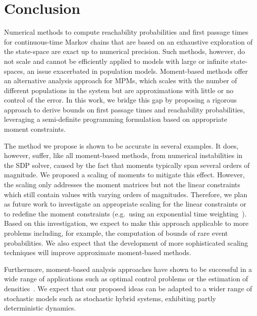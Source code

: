 \section{Conclusion}\label{sec:mfpt:conclusion}
Numerical methods to compute reachability probabilities and first passage times
for continuous-time Markov chains that are based on an exhaustive
exploration of the state-space
are exact up to numerical precision. Such methods, however, do not
scale and cannot be efficiently applied to models with large or
infinite state-spaces,
an issue exacerbated in population models. Moment-based methods offer
an alternative analysis approach
for \acp{MPM}, which scales with the number of different populations
in the system
but are approximations with little or no control of the error.
In this work,
we bridge this gap by proposing a rigorous approach to derive bounds
on first passage
times and reachability probabilities, leveraging a semi-definite
programming formulation
based on appropriate moment constraints.

The method we propose is shown to be accurate in several examples. It
does, however, suffer, like all moment-based methods, from numerical
instabilities in the \ac{SDP} solver, caused by the fact that moments
typically span several orders of magnitude. We proposed a scaling of
moments to mitigate this effect.
However, the scaling only addresses the moment matrices but not the
linear constraints
which still contain values with varying orders of magnitudes.
Therefore, we plan as future work to investigate an appropriate
scaling for the linear constraints
or to redefine the moment
constraints (e.g.\ using an exponential time
weighting~\parencite{dowdy2018dynamic}).
Based on this investigation, we expect to make this approach applicable to
more problems including, for example, the computation of bounds of
rare event probabilities.
We also expect that the development of more sophisticated scaling
techniques will  improve approximate moment-based methods.

Furthermore, moment-based analysis approaches have shown to be successful
in a wide range of applications such as optimal control problems or
the estimation
of densities~\parencite{lasserre2010moments}.
We expect that our proposed ideas   can be adapted to a wider range
of stochastic models such as stochastic hybrid systems, exhibiting
partly deterministic dynamics.
